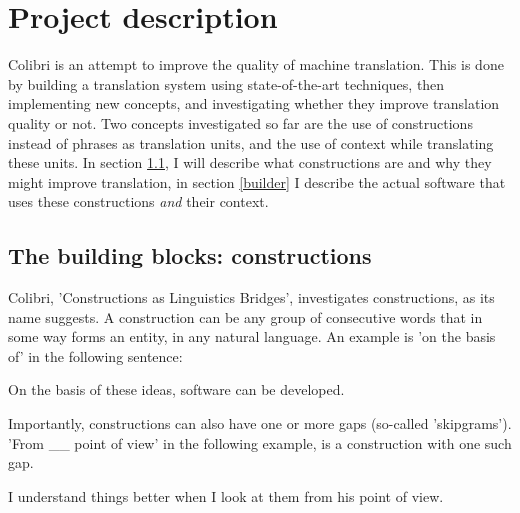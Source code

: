 \documentclass[12pt]{article}
\begin{document}
\section{Project description} \label{Description}

Colibri is an attempt to improve the quality of machine translation. This is done by building a translation system using state-of-the-art techniques, then implementing new concepts, and investigating whether they improve translation quality or not. Two concepts investigated so far are the use of constructions instead of phrases as translation units, and the use of context while translating these units. In section \ref{constructions}, I will describe what constructions are and why they might improve translation, in section \ref{builder} I describe the actual software that uses these constructions \emph{and} their context.

\subsection{The building blocks: constructions} \label{constructions}

Colibri, 'Constructions as Linguistics Bridges', investigates constructions, as its name suggests. A construction can be any group of consecutive words that in some way forms an entity, in any natural language. An example is 'on the basis of' in the following sentence:

\begin{examples}
\item On the basis of these ideas, software can be developed.
\end{examples}

Importantly, constructions can also have one or more gaps (so-called 'skipgrams'). 'From \_\_ point of view' in the following example, is a construction with one such gap. 

\begin{examples}
\item I understand things better when I look at them from his point of view.
\end{examples}
\end{document}

